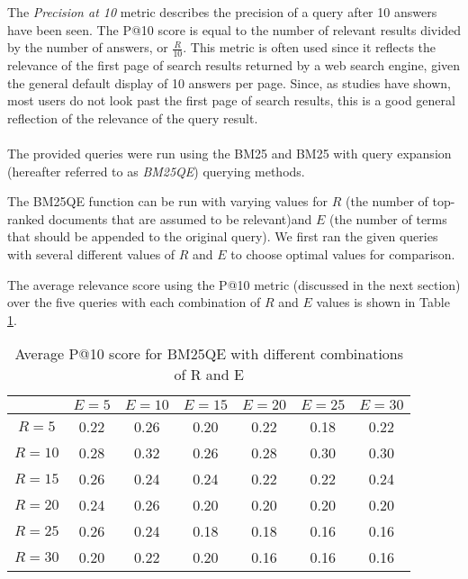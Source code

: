 The \textit{Precision at 10} metric describes the precision of a query after 10 answers have been seen. The P@10 score is equal to the number of relevant results divided by the number of answers, or $\frac{R}{10}$. This metric is often used since it reflects the relevance of the first page of search results returned by a web search engine, given the general default display of 10 answers per page. Since, as studies have shown, most users do not look past the first page of search results, this is a good general reflection of the relevance of the query result.

\paragraph*{}

The provided queries were run using the BM25 and BM25 with query expansion (hereafter referred to as \textit{BM25QE}) querying methods.

The BM25QE function can be run with varying values for $R$ (the number of top-ranked documents that are assumed to be relevant)and $E$ (the number of terms that should be appended to the original query). We first ran the given queries with several different values of $R$ and $E$ to choose optimal values for comparison.

The average relevance score using the P@10 metric (discussed in the next section) over the five queries with each combination of $R$ and $E$ values is shown in Table \ref{table:BM25QEtest}.

\begin{table}
\begin{center}
\begin{tabular}{ c | c c c c c c }
	        &$E=5$ &$E=10$&$E=15$&$E=20$&$E=25$&$E=30$\\
	\hline
	$R=5$   & 0.22 & 0.26 & 0.20 & 0.22 & 0.18 & 0.22\\
	$R=10$  & 0.28 & 0.32 & 0.26 & 0.28 & 0.30 & 0.30\\
	$R=15$  & 0.26 & 0.24 & 0.24 & 0.22 & 0.22 & 0.24\\
	$R=20$  & 0.24 & 0.26 & 0.20 & 0.20 & 0.20 & 0.20\\
	$R=25$  & 0.26 & 0.24 & 0.18 & 0.18 & 0.16 & 0.16\\
	$R=30$  & 0.20 & 0.22 & 0.20 & 0.16 & 0.16 & 0.16\\
\end{tabular}
\end{center}
\caption {Average P@10 score for BM25QE with different combinations of R and E}\label{table:BM25QEtest}
\end{table}

